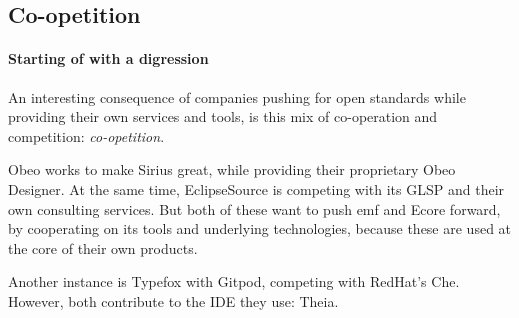\subsection{Co-opetition}



\paragraph*{Starting of with a digression}

An interesting consequence of companies pushing for open standards while providing their own services and tools, is this mix of co-operation and competition: \emph{co-opetition}.

Obeo works to make Sirius great, while providing their proprietary Obeo Designer.
At the same time, EclipseSource is competing with its GLSP and their own consulting services.
But both of these want to push \gls{emf} and \gls{Ecore} forward, by cooperating on its tools and underlying technologies, because these are used at the core of their own products.

Another instance is Typefox with Gitpod, competing with RedHat's Che.
However, both contribute to the \gls{IDE} they use: \gls{Theia}.
